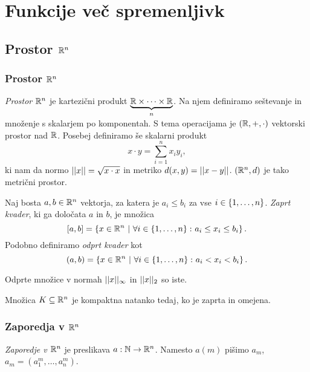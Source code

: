 \section{Funkcije več spremenljivk}
\subsection{Prostor $\mathbb{R}^n$}
\subsubsection{Prostor $\mathbb{R}^n$}
\begin{definicija}
    \emph{Prostor $\mathbb{R}^n$} je kartezični produkt
    $\underbrace{\mathbb{R} \times \dots \times \mathbb{R}}_n$. Na njem definiramo
    seštevanje in množenje s skalarjem po komponentah. S tema
    operacijama je $(\mathbb{R},+,\cdot)$ vektorski prostor nad $\mathbb{R}$. Posebej
    definiramo še skalarni produkt
    \[
    x \cdot y = \sum_{i=1}^n x_iy_i,
    \]
    ki nam da normo $||x||=\sqrt{x \cdot x}$ in metriko
    $d(x,y) = ||x-y||$. $(\mathbb{R}^n,d)$ je tako metrični prostor.
    \end{definicija}

\begin{definicija}
    Naj bosta $a,b \in \mathbb{R}^n$ vektorja, za katera je $a_i \leq b_i$ za
    vse $i \in \left\{1,\dots,n\right\}$. \emph{Zaprt kvader}, ki
    ga določata $a$ in $b$, je množica
    \[
    [a,b] = \left\{x\in\mathbb{R}^n \ | \ \forall i \in \left\{1,\dots,n\right\} \colon
    a_i \leq x_i \leq b_i\right\}.
    \]
    Podobno definiramo \emph{odprt kvader} kot
    \[
    (a,b) = \left\{x\in\mathbb{R}^n \ | \ \forall i \in \left\{1,\dots,n\right\} \colon
    a_i < x_i < b_i\right\}.
    \]
    \end{definicija}
    
    \begin{opomba}
    Odprte množice v normah $||x||_\infty$ in $||x||_2$ so iste.
    \end{opomba}
    
    \begin{izrek}
    Množica $K\subseteq\mathbb{R}^n$ je kompaktna natanko tedaj, ko je zaprta
    in omejena.
    \end{izrek}

\subsubsection{Zaporedja v $\mathbb{R}^n$}
\begin{definicija}
    \emph{Zaporedje v $\mathbb{R}^n$} je preslikava $a: \mathbb{N} \to \mathbb{R}^n$. Namesto $a(m)$ pišimo $a_m$, $a_m = (a_1^m, \ldots, a_n^m)$.
\end{definicija}

